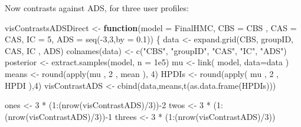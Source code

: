 \documentclass[
  10pt,
  dvipsnames,enabledeprecatedfontcommands]{scrartcl}
\newenvironment{Shaded}{\begin{snugshade}}{\end{snugshade}}
\newcommand{\AttributeTok}[1]{\textcolor[rgb]{0.77,0.63,0.00}{#1}}
\newcommand{\ControlFlowTok}[1]{\textcolor[rgb]{0.13,0.29,0.53}{\textbf{#1}}}
\newcommand{\DecValTok}[1]{\textcolor[rgb]{0.00,0.00,0.81}{#1}}
\newcommand{\FloatTok}[1]{\textcolor[rgb]{0.00,0.00,0.81}{#1}}
\newcommand{\FunctionTok}[1]{\textcolor[rgb]{0.00,0.00,0.00}{#1}}
\newcommand{\NormalTok}[1]{#1}
\newcommand{\OtherTok}[1]{\textcolor[rgb]{0.56,0.35,0.01}{#1}}
\newcommand{\SpecialCharTok}[1]{\textcolor[rgb]{0.00,0.00,0.00}{#1}}
\newcommand{\StringTok}[1]{\textcolor[rgb]{0.31,0.60,0.02}{#1}}
\begin{document}
Now contrasts against \textsf{ADS}, for three user profiles:

\vspace{1mm}
\footnotesize

\begin{Shaded}
\begin{Highlighting}[]
\NormalTok{visContrastsADSDirect }\OtherTok{\textless{}{-}} \ControlFlowTok{function}\NormalTok{(}\AttributeTok{model =}\NormalTok{ FinalHMC, }\AttributeTok{CBS =}\NormalTok{ CBS , }\AttributeTok{CAS =}\NormalTok{ CAS, }\AttributeTok{IC =}  \DecValTok{5}\NormalTok{, }
                            \AttributeTok{ADS =} \FunctionTok{seq}\NormalTok{(}\SpecialCharTok{{-}}\DecValTok{3}\NormalTok{,}\DecValTok{3}\NormalTok{,}\AttributeTok{by  =} \FloatTok{0.1}\NormalTok{))}
\NormalTok{\{}
\NormalTok{  data }\OtherTok{\textless{}{-}} \FunctionTok{expand.grid}\NormalTok{(CBS, groupID, CAS, IC , ADS)}
  \FunctionTok{colnames}\NormalTok{(data) }\OtherTok{\textless{}{-}} \FunctionTok{c}\NormalTok{(}\StringTok{"CBS"}\NormalTok{, }\StringTok{"groupID"}\NormalTok{, }\StringTok{"CAS"}\NormalTok{, }\StringTok{"IC"}\NormalTok{, }\StringTok{"ADS"}\NormalTok{)}
\NormalTok{  posterior }\OtherTok{\textless{}{-}} \FunctionTok{extract.samples}\NormalTok{(model, }\AttributeTok{n =} \FloatTok{1e5}\NormalTok{)}
\NormalTok{  mu }\OtherTok{\textless{}{-}} \FunctionTok{link}\NormalTok{( model, }\AttributeTok{data=}\NormalTok{data ) }
\NormalTok{  means }\OtherTok{\textless{}{-}}  \FunctionTok{round}\NormalTok{(}\FunctionTok{apply}\NormalTok{(mu , }\DecValTok{2}\NormalTok{ , mean ), }\DecValTok{4}\NormalTok{)}
\NormalTok{  HPDIs }\OtherTok{\textless{}{-}} \FunctionTok{round}\NormalTok{(}\FunctionTok{apply}\NormalTok{( mu , }\DecValTok{2}\NormalTok{ , HPDI ),}\DecValTok{4}\NormalTok{)}
\NormalTok{  visContrastADS }\OtherTok{\textless{}{-}} \FunctionTok{cbind}\NormalTok{(data,means,}\FunctionTok{t}\NormalTok{(}\FunctionTok{as.data.frame}\NormalTok{(HPDIs)))}
  
  
\NormalTok{  ones }\OtherTok{\textless{}{-}} \DecValTok{3} \SpecialCharTok{*}\NormalTok{ (}\DecValTok{1}\SpecialCharTok{:}\NormalTok{(}\FunctionTok{nrow}\NormalTok{(visContrastADS)}\SpecialCharTok{/}\DecValTok{3}\NormalTok{))}\SpecialCharTok{{-}}\DecValTok{2}
\NormalTok{  twos }\OtherTok{\textless{}{-}} \DecValTok{3} \SpecialCharTok{*}\NormalTok{ (}\DecValTok{1}\SpecialCharTok{:}\NormalTok{(}\FunctionTok{nrow}\NormalTok{(visContrastADS)}\SpecialCharTok{/}\DecValTok{3}\NormalTok{))}\SpecialCharTok{{-}}\DecValTok{1}
\NormalTok{  threes }\OtherTok{\textless{}{-}} \DecValTok{3} \SpecialCharTok{*}\NormalTok{ (}\DecValTok{1}\SpecialCharTok{:}\NormalTok{(}\FunctionTok{nrow}\NormalTok{(visContrastADS)}\SpecialCharTok{/}\DecValTok{3}\NormalTok{))}
  

\end{Highlighting}
\end{Shaded}
\end{document}
